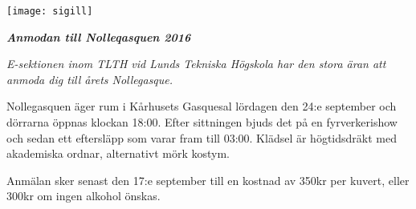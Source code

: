 \documentclass[11pt]{article}
\def\date{2016}
\def\doctitle{Anmodan till Nolleqasquen \date}
\begin{document}

    \begin{center}
        \texttt{[image: sigill]}
        \par
        \vspace*{8mm}

        \textit{\textbf{\Large \doctitle}}

    \end{center}
    \vspace{1mm}

    {\it
    E-sektionen inom TLTH vid Lunds Tekniska Högskola
    har den stora äran att anmoda dig
    till årets Nollegasque.

    \vspace{1mm}

    Nollegasquen äger rum i Kårhusets Gasquesal lördagen den 24:e september och dörrarna öppnas klockan 18:00. Efter sittningen bjuds det på en fyrverkerishow och sedan ett eftersläpp som varar fram till 03:00. Klädsel är högtidsdräkt med akademiska ordnar, alternativt mörk kostym.

    \vspace{1mm}

    Anmälan sker senast den 17:e september till en kostnad av 350kr per kuvert, eller 300kr om ingen alkohol önskas.
    }
\end{document}
